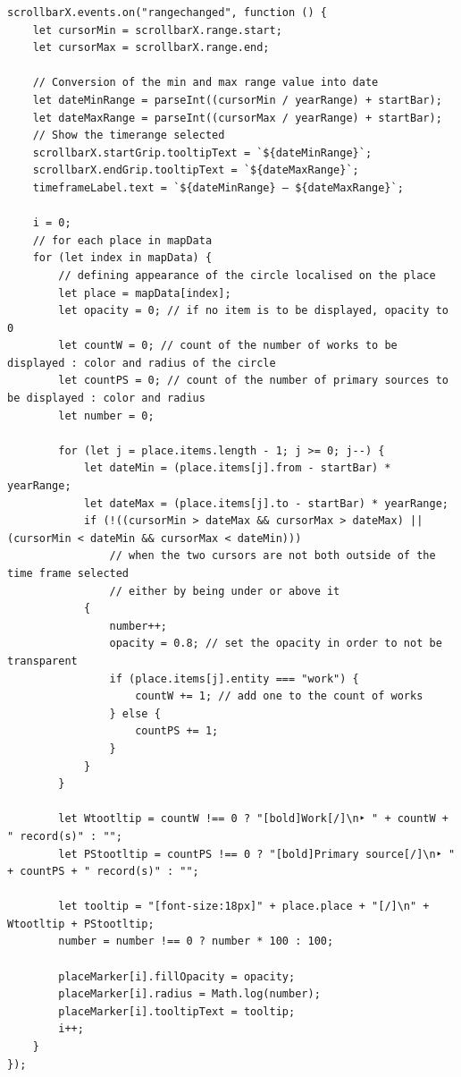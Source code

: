 \documentclass[a4paper,12pt,twoside]{book}
\begin{document}
\begin{lstlisting}
scrollbarX.events.on("rangechanged", function () {
    let cursorMin = scrollbarX.range.start;
    let cursorMax = scrollbarX.range.end;

    // Conversion of the min and max range value into date
    let dateMinRange = parseInt((cursorMin / yearRange) + startBar);
    let dateMaxRange = parseInt((cursorMax / yearRange) + startBar);
    // Show the timerange selected
    scrollbarX.startGrip.tooltipText = `${dateMinRange}`;
    scrollbarX.endGrip.tooltipText = `${dateMaxRange}`;
    timeframeLabel.text = `${dateMinRange} — ${dateMaxRange}`;

    i = 0;
    // for each place in mapData
    for (let index in mapData) {
        // defining appearance of the circle localised on the place
        let place = mapData[index];
        let opacity = 0; // if no item is to be displayed, opacity to 0
        let countW = 0; // count of the number of works to be displayed : color and radius of the circle
        let countPS = 0; // count of the number of primary sources to be displayed : color and radius
        let number = 0;

        for (let j = place.items.length - 1; j >= 0; j--) {
            let dateMin = (place.items[j].from - startBar) * yearRange;
            let dateMax = (place.items[j].to - startBar) * yearRange;
            if (!((cursorMin > dateMax && cursorMax > dateMax) || (cursorMin < dateMin && cursorMax < dateMin)))
                // when the two cursors are not both outside of the time frame selected
                // either by being under or above it
            {
                number++;
                opacity = 0.8; // set the opacity in order to not be transparent
                if (place.items[j].entity === "work") {
                    countW += 1; // add one to the count of works
                } else {
                    countPS += 1;
                }
            }
        }

        let Wtootltip = countW !== 0 ? "[bold]Work[/]\n‣ " + countW + " record(s)" : "";
        let PStootltip = countPS !== 0 ? "[bold]Primary source[/]\n‣ " + countPS + " record(s)" : "";

        let tooltip = "[font-size:18px]" + place.place + "[/]\n" + Wtootltip + PStootltip;
        number = number !== 0 ? number * 100 : 100;

        placeMarker[i].fillOpacity = opacity;
        placeMarker[i].radius = Math.log(number);
        placeMarker[i].tooltipText = tooltip;
        i++;
    }
});
\end{lstlisting}
\end{document}
